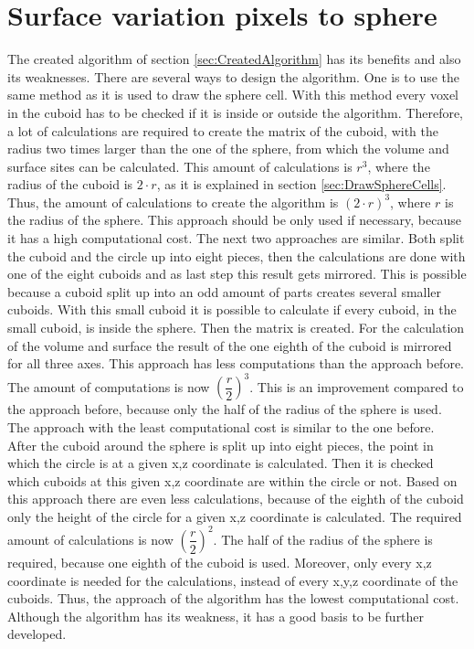 \section{Surface variation pixels to sphere}
The created algorithm of section \ref{sec:CreatedAlgorithm} has its benefits and also its weaknesses. There are several ways to design the algorithm. One is to use the same method as it is used to draw the sphere cell. With this method every voxel in the cuboid has to be checked if it is inside or outside the algorithm. Therefore, a lot of calculations are required to create the matrix of the cuboid, with the radius two times larger than the one of the sphere, from which the volume and surface sites can be calculated. This amount of calculations is $r^{3}$, where the radius of the cuboid is $2 \cdot r$, as it is explained in section \ref{sec:DrawSphereCells}. Thus, the amount of calculations to create the algorithm is $(2 \cdot r)^{3}$, where $r$ is the radius of the sphere. This approach should be only used if necessary, because it has a high computational cost. \newline
The next two approaches are similar. Both split the cuboid and the circle up into eight pieces, then the calculations are done with one of the eight cuboids and as last step this result gets mirrored. This is possible because a cuboid split up into an odd amount of parts creates several smaller cuboids. With this small cuboid it is possible to calculate if every cuboid, in the small cuboid, is inside the sphere. Then the matrix is created. For the calculation of the volume and surface the result of the one eighth of the cuboid is mirrored for all three axes. This approach has less computations than the approach before. The amount of computations is now $(\dfrac{r}{2})^{3}$. This is an improvement compared to the approach before, because only the half of the radius of the sphere is used. \newline
The approach with the least computational cost is similar to the one before. After the cuboid around the sphere is split up into eight pieces, the point in which the circle is at a given x,z coordinate is calculated. Then it is checked which cuboids at this given x,z coordinate are within the circle or not. Based on this approach there are even less calculations, because of the eighth of the cuboid only the height of the circle for a given x,z coordinate is calculated. The required amount of calculations is now $(\dfrac{r}{2})^{2}$. The half of the radius of the sphere is required, because one eighth of the cuboid is used. Moreover, only every x,z coordinate is needed for the calculations, instead of every x,y,z coordinate of the cuboids. Thus, the approach of the algorithm has the lowest computational cost. Although the algorithm has its weakness, it has a good basis to be further developed.


